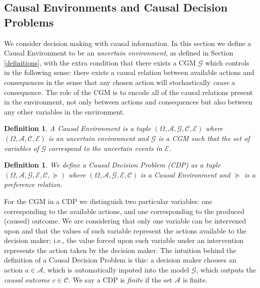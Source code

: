 \documentclass[review]{elsarticle}
\newtheorem{definition}[theorem]{Definition}
\begin{document}
\subsection{Causal Environments and Causal Decision Problems}{\label{causal_problems}}
We consider decision making with causal information. In this section we define a Causal Environment to be an \textit{uncertain environment}, as defined in Section \ref{definitions}, with the extra condition that there exists a CGM $\mathcal{G}$ which controls in the following sense: there exists a causal relation between available actions and consequences in the sense that any chosen action will stochastically \textit{cause} a consequence. The role of the CGM is to encode all of the causal relations present in the environment, not only between actions and consequences but also between any other variables in the environment. 

\begin{definition}{\label{causal_environment}}
A Causal Environment is a tuple $(\Omega, \mathcal{A},\mathcal{G},\mathcal{C},\mathcal{E})$ where $(\Omega, \mathcal{A},\mathcal{C},\mathcal{E})$ is an uncertain environment and $\mathcal{G}$ is a CGM such that the set of variables of $\mathcal{G}$ correspond to the uncertain events in $\mathcal{E}$.
\end{definition}

\begin{definition}
We define a Causal Decision Problem (CDP) as a tuple $(\Omega, \mathcal{A}, \mathcal{G},\mathcal{E},\mathcal{C},\succeq)$ where $(\Omega, \mathcal{A}, \mathcal{G},\mathcal{E},\mathcal{C})$ is a Causal Environment and $\succeq$ is a preference relation. 
\end{definition}

For the CGM in a CDP we distinguish two particular variables: one corresponding to the available actions, and one corresponding to the produced (caused) outcome. We are considering that only one variable can be intervened upon and that the values of such variable represent the actions available to the decision maker; i.e., the value forced upon such variable under an intervention represents the action taken by the decision maker. The intuition behind the definition of a Causal Decision Problem is this: a decision maker chooses an action $a \in \mathcal{A}$, which is automatically inputed into the model $\mathcal{G}$, which outputs the \textit{causal outcome} $c \in \mathcal{C}$. We say a CDP is \textit{finite} if the set $\mathcal{A}$ is finite.
\end{document}
